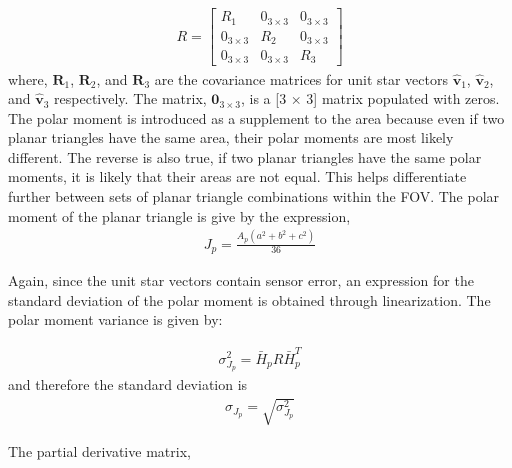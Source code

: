 \documentclass[]{aiaa-tc}%
\begin{document}
\begin{align}
R = 
\begin{bmatrix}
 R_1 & 0_{3\times3} & 0_{3\times3}\\
 0_{3\times3} & R_2 & 0_{3\times3}\\
 0_{3\times3} & 0_{3\times3} & R_3
\end{bmatrix}
\end{align}
where, $\textbf{R}_1$,  $\textbf{R}_2$, and $\textbf{R}_3$ are the covariance matrices for unit star vectors $\hat{\textbf{v}}_1$, $\hat{\textbf{v}}_2$, and $\hat{\textbf{v}}_3$ respectively.
The matrix, $\textbf{0}_{3 \times 3}$, is a [3 $\times$ 3] matrix populated with zeros. The polar moment is introduced as
a supplement to the area because even if two planar triangles have the same area, their polar moments are most likely different. The reverse is also true, if two planar triangles have the same polar moments, it is likely that their areas are not equal. This helps differentiate further between sets of planar triangle combinations within the FOV. The polar moment of the planar triangle is give by the expression,
\begin{align}
J_p = \frac{A_p(a^2+b^2+c^2)}{36}
\end{align}

Again, since the unit star vectors contain sensor error, an expression for the standard deviation of the polar moment is obtained through linearization. The polar moment variance is given by:

\begin{align}
\sigma^2_{J_{p}} = \bar{H}_p R \bar{H}^T_p
\end{align}
and therefore the standard deviation is 
\begin{align}
\sigma_{J_{p}} = \sqrt{\sigma_{J_{p}}^2}
\end{align}

The partial derivative matrix, 
\end{document}
